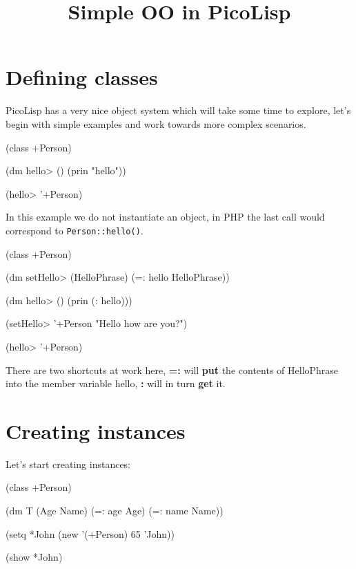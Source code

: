 \title{Simple OO in PicoLisp}

\maketitle

\section{Defining classes}
\label{sec:simple-oo-defining-classes}

PicoLisp has a very nice object system which will take some time to
explore, let's begin with simple examples and work towards more complex
scenarios.


\begin{wideverbatim}
(class +Person)

(dm hello> ()
    (prin "hello"))
 
(hello> '+Person)
\end{wideverbatim}

In this example we do not instantiate an object, in PHP the last call
would correspond to \texttt{Person::hello()}.


\begin{wideverbatim}
(class +Person)

(dm setHello> (HelloPhrase)
    (=: hello HelloPhrase))

(dm hello> ()
    (prin (: hello)))
    
(setHello> '+Person "Hello how are you?")

(hello> '+Person)
\end{wideverbatim}

There are two shortcuts at work here, \textbf{=:} will \textbf{put} the contents of
HelloPhrase into the member variable hello, \textbf{:} will in turn \textbf{get} it.


\section{Creating instances}
\label{sec:simple-oo-creating-instances}

Let's start creating instances:

\begin{wideverbatim}
(class +Person)

(dm T (Age Name)
    (=: age Age)
    (=: name Name))

(setq *John (new '(+Person) 65 'John))

(show *John)
\end{wideverbatim}

